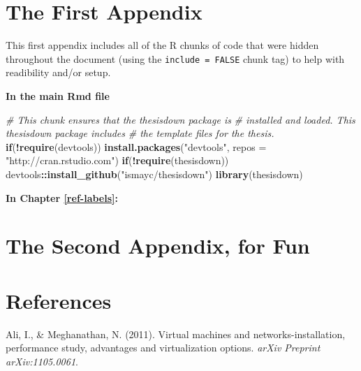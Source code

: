 \documentclass[12pt,twoside]{reedthesis}
\newenvironment{Shaded}{\begin{snugshade}}{\end{snugshade}}
\newcommand{\CommentTok}[1]{\textcolor[rgb]{0.56,0.35,0.01}{\textit{#1}}}
\newcommand{\ControlFlowTok}[1]{\textcolor[rgb]{0.13,0.29,0.53}{\textbf{#1}}}
\newcommand{\DataTypeTok}[1]{\textcolor[rgb]{0.13,0.29,0.53}{#1}}
\newcommand{\KeywordTok}[1]{\textcolor[rgb]{0.13,0.29,0.53}{\textbf{#1}}}
\newcommand{\NormalTok}[1]{#1}
\newcommand{\OperatorTok}[1]{\textcolor[rgb]{0.81,0.36,0.00}{\textbf{#1}}}
\newcommand{\StringTok}[1]{\textcolor[rgb]{0.31,0.60,0.02}{#1}}
\theoremstyle{definition}
\theoremstyle{definition}
\theoremstyle{definition}
\theoremstyle{remark}
\begin{document}
\appendix

\hypertarget{the-first-appendix}{%
\chapter{The First Appendix}\label{the-first-appendix}}

This first appendix includes all of the R chunks of code that were
hidden throughout the document (using the \texttt{include\ =\ FALSE}
chunk tag) to help with readibility and/or setup.

\textbf{In the main Rmd file}
\begin{Shaded}
\begin{Highlighting}[]
\CommentTok{# This chunk ensures that the thesisdown package is}
\CommentTok{# installed and loaded. This thesisdown package includes}
\CommentTok{# the template files for the thesis.}
\ControlFlowTok{if}\NormalTok{(}\OperatorTok{!}\KeywordTok{require}\NormalTok{(devtools))}
  \KeywordTok{install.packages}\NormalTok{(}\StringTok{"devtools"}\NormalTok{, }\DataTypeTok{repos =} \StringTok{"http://cran.rstudio.com"}\NormalTok{)}
\ControlFlowTok{if}\NormalTok{(}\OperatorTok{!}\KeywordTok{require}\NormalTok{(thesisdown))}
\NormalTok{  devtools}\OperatorTok{::}\KeywordTok{install_github}\NormalTok{(}\StringTok{"ismayc/thesisdown"}\NormalTok{)}
\KeywordTok{library}\NormalTok{(thesisdown)}
\end{Highlighting}
\end{Shaded}
\textbf{In Chapter \ref{ref-labels}:}

\hypertarget{the-second-appendix-for-fun}{%
\chapter{The Second Appendix, for
Fun}\label{the-second-appendix-for-fun}}

\backmatter

\hypertarget{references}{%
\chapter*{References}\label{references}}


\noindent

\setlength{\parindent}{-0.20in}
\setlength{\leftskip}{0.20in}
\setlength{\parskip}{8pt}

\hypertarget{refs}{}
\leavevmode\hypertarget{ref-Cap3_2_mT}{}%
Ali, I., \& Meghanathan, N. (2011). Virtual machines and
networks-installation, performance study, advantages and virtualization
options. \emph{arXiv Preprint arXiv:1105.0061}.
\end{document}
